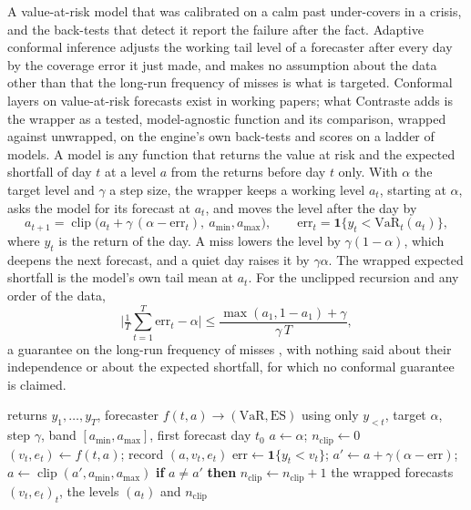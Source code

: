 A value-at-risk model that was calibrated on a calm past under-covers in a crisis, and the back-tests that detect it report the failure after the fact. Adaptive conformal inference \citep{proposed:gibbs2021} adjusts the working tail level of a forecaster after every day by the coverage error it just made, and makes no assumption about the data other than that the long-run frequency of misses is what is targeted. Conformal layers on value-at-risk forecasts exist in working papers; what Contraste adds is the wrapper as a tested, model-agnostic function and its comparison, wrapped against unwrapped, on the engine's own back-tests and scores on a ladder of models. A model is any function that returns the value at risk and the expected shortfall of day $t$ at a level $a$ from the returns before day $t$ only. With $\alpha$ the target level and $\gamma$ a step size, the wrapper keeps a working level $a_t$, starting at $\alpha$, asks the model for its forecast at $a_t$, and moves the level after the day by
\begin{equation}
a_{t+1}=\operatorname{clip}\Big(a_t+\gamma\,(\alpha-\mathrm{err}_t),\ a_{\min},a_{\max}\Big),\qquad \mathrm{err}_t=\mathbf 1\{y_t<\mathrm{VaR}_t(a_t)\},
\label{eq:bs16-update}
\end{equation}
where $y_t$ is the return of the day. A miss lowers the level by $\gamma(1-\alpha)$, which deepens the next forecast, and a quiet day raises it by $\gamma\alpha$. The wrapped expected shortfall is the model's own tail mean at $a_t$. For the unclipped recursion and any order of the data,
\begin{equation}
\Big|\tfrac1T\textstyle\sum_{t=1}^{T}\mathrm{err}_t-\alpha\Big|\le\frac{\max(a_1,1-a_1)+\gamma}{\gamma\,T},
\label{eq:bs16-bound}
\end{equation}
a guarantee on the long-run frequency of misses \citep{proposed:gibbs2021}, with nothing said about their independence or about the expected shortfall, for which no conformal guarantee is claimed.

\begin{algorithm}[htbp]
\caption{Adaptive conformal wrapper of a value-at-risk forecaster.}
\label{alg:bs16}
\begin{algorithmic}[1]
\Require returns $y_1,\dots,y_T$, forecaster $f(t,a)\to(\mathrm{VaR},\mathrm{ES})$ using only $y_{<t}$, target $\alpha$, step $\gamma$, band $[a_{\min},a_{\max}]$, first forecast day $t_0$
\State $a\gets\alpha$; \quad $n_{\mathrm{clip}}\gets 0$
  \State $(v_t,e_t)\gets f(t,a)$; \quad record $(a,v_t,e_t)$
  \State $\mathrm{err}\gets\mathbf 1\{y_t<v_t\}$; \quad $a'\gets a+\gamma(\alpha-\mathrm{err})$; \quad $a\gets\operatorname{clip}(a',a_{\min},a_{\max})$
  \State \textbf{if} $a\neq a'$ \textbf{then} $n_{\mathrm{clip}}\gets n_{\mathrm{clip}}+1$
\EndFor
\State \Return the wrapped forecasts $(v_t,e_t)_{t}$, the levels $(a_t)$ and $n_{\mathrm{clip}}$
\end{algorithmic}
\end{algorithm}

